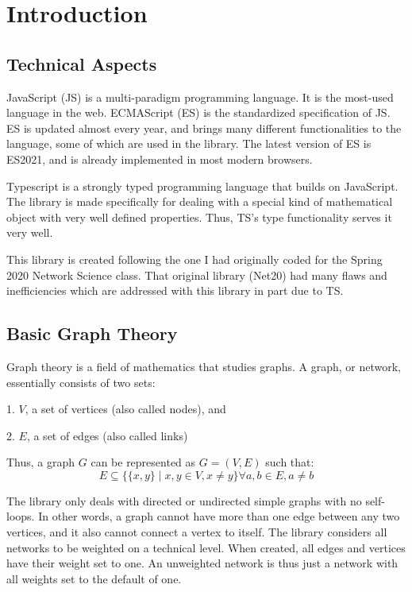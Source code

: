 \chapter{Introduction}

\section{Technical Aspects}

JavaScript (JS) is a multi-paradigm programming language.
It is the most-used language in the web.
ECMAScript (ES) is the standardized specification of JS.
ES is updated almost every year, and brings many different functionalities to the language, some of which are used in the library.
The latest version of ES is ES2021, and is already implemented in most modern browsers.

Typescript is a strongly typed programming language that builds on JavaScript.
The library is made specifically for dealing with a special kind of mathematical object with very well defined properties.
Thus, TS's type functionality serves it very well.

This library is created following the one I had originally coded for the Spring 2020 Network Science class.
That original library (Net20) had many flaws and inefficiencies which are addressed with this library in part due to TS.

\section{Basic Graph Theory}

Graph theory is a field of mathematics that studies graphs.
A graph, or network, essentially consists of two sets:

1. $V$, a set of vertices (also called nodes), and

2. $E$, a set of edges (also called links)

Thus, a graph $G$ can be represented as $G=(V,E)$ such that:
$$E\subseteq \{\{x,y\}\mid x,y\in V, x\ne y\}\forall a,b \in E, a\ne b$$

The library only deals with directed or undirected simple graphs with no self-loops.
In other words, a graph cannot have more than one edge between any two vertices, and it also cannot connect a vertex to itself.
The library considers all networks to be weighted on a technical level.
When created, all edges and vertices have their weight set to one.
An unweighted network is thus just a network with all weights set to the default of one.
